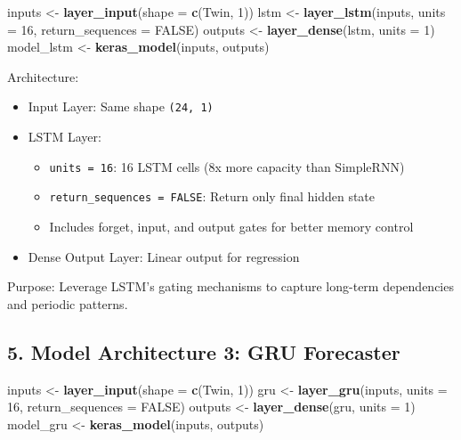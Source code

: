 \documentclass[
]{article}
\newenvironment{Shaded}{\begin{snugshade}}{\end{snugshade}}
\newcommand{\AttributeTok}[1]{\textcolor[rgb]{0.13,0.29,0.53}{#1}}
\newcommand{\ConstantTok}[1]{\textcolor[rgb]{0.56,0.35,0.01}{#1}}
\newcommand{\DecValTok}[1]{\textcolor[rgb]{0.00,0.00,0.81}{#1}}
\newcommand{\FunctionTok}[1]{\textcolor[rgb]{0.13,0.29,0.53}{\textbf{#1}}}
\newcommand{\NormalTok}[1]{#1}
\newcommand{\OtherTok}[1]{\textcolor[rgb]{0.56,0.35,0.01}{#1}}
\providecommand{\tightlist}{%
  \setlength{\itemsep}{0pt}\setlength{\parskip}{0pt}}
\begin{document}
\begin{Shaded}
\begin{Highlighting}[]
\NormalTok{inputs }\OtherTok{\textless{}{-}} \FunctionTok{layer\_input}\NormalTok{(}\AttributeTok{shape =} \FunctionTok{c}\NormalTok{(Twin, }\DecValTok{1}\NormalTok{))}
\NormalTok{lstm }\OtherTok{\textless{}{-}} \FunctionTok{layer\_lstm}\NormalTok{(inputs, }\AttributeTok{units =} \DecValTok{16}\NormalTok{, }\AttributeTok{return\_sequences =} \ConstantTok{FALSE}\NormalTok{)}
\NormalTok{outputs }\OtherTok{\textless{}{-}} \FunctionTok{layer\_dense}\NormalTok{(lstm, }\AttributeTok{units =} \DecValTok{1}\NormalTok{)}
\NormalTok{model\_lstm }\OtherTok{\textless{}{-}} \FunctionTok{keras\_model}\NormalTok{(inputs, outputs)}
\end{Highlighting}
\end{Shaded}

Architecture:

\begin{itemize}
\tightlist
\item
  Input Layer: Same shape \texttt{(24,\ 1)}
\item
  LSTM Layer:

  \begin{itemize}
  \tightlist
  \item
    \texttt{units\ =\ 16}: 16 LSTM cells (8x more capacity than
    SimpleRNN)
  \item
    \texttt{return\_sequences\ =\ FALSE}: Return only final hidden state
  \item
    Includes forget, input, and output gates for better memory control
  \end{itemize}
\item
  Dense Output Layer: Linear output for regression
\end{itemize}

Purpose: Leverage LSTM's gating mechanisms to capture long-term
dependencies and periodic patterns.

\subsection{5. Model Architecture 3: GRU
Forecaster}\label{model-architecture-3-gru-forecaster}

\begin{Shaded}
\begin{Highlighting}[]
\NormalTok{inputs }\OtherTok{\textless{}{-}} \FunctionTok{layer\_input}\NormalTok{(}\AttributeTok{shape =} \FunctionTok{c}\NormalTok{(Twin, }\DecValTok{1}\NormalTok{))}
\NormalTok{gru }\OtherTok{\textless{}{-}} \FunctionTok{layer\_gru}\NormalTok{(inputs, }\AttributeTok{units =} \DecValTok{16}\NormalTok{, }\AttributeTok{return\_sequences =} \ConstantTok{FALSE}\NormalTok{)}
\NormalTok{outputs }\OtherTok{\textless{}{-}} \FunctionTok{layer\_dense}\NormalTok{(gru, }\AttributeTok{units =} \DecValTok{1}\NormalTok{)}
\NormalTok{model\_gru }\OtherTok{\textless{}{-}} \FunctionTok{keras\_model}\NormalTok{(inputs, outputs)}
\end{Highlighting}
\end{Shaded}
\end{document}
